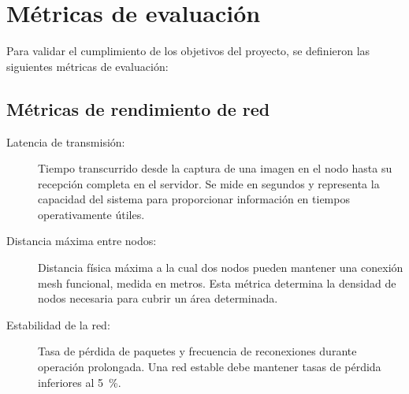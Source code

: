 \documentclass[a4paper, 12pt]{report}
\begin{document}




\section{Métricas de evaluación}

Para validar el cumplimiento de los objetivos del proyecto, se definieron las
siguientes métricas de evaluación:

\subsection{Métricas de rendimiento de red}

\begin{description}
  \item[Latencia de transmisión:] Tiempo transcurrido desde la captura de una
    imagen en el nodo hasta su recepción completa en el servidor. Se mide
    en segundos y representa la capacidad del sistema para proporcionar
    información en tiempos operativamente útiles.
  \item[Distancia máxima entre nodos:] Distancia física máxima a la cual dos
    nodos pueden mantener una conexión \gls{mesh} funcional, medida en
    metros. Esta métrica determina la densidad de nodos necesaria para
    cubrir un área determinada.
  \item[Estabilidad de la red:] Tasa de pérdida de paquetes y frecuencia de
    reconexiones durante operación prolongada. Una red estable debe
    mantener tasas de pérdida inferiores al \qty{5}{\percent}.
\end{description}
\end{document}
